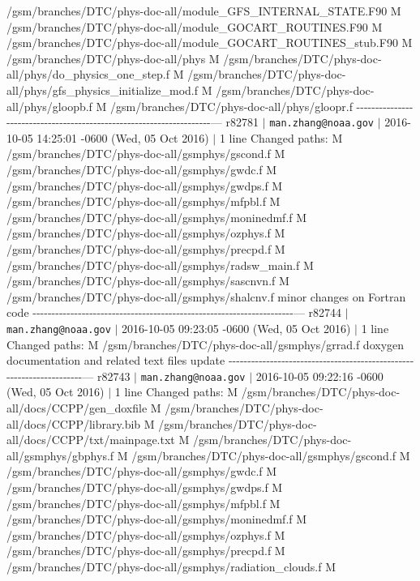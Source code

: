 \begin{DoxyItemize}
/gsm/branches/\+D\+T\+C/phys-\/doc-\/all/module\+\_\+\+G\+F\+S\+\_\+\+I\+N\+T\+E\+R\+N\+A\+L\+\_\+\+S\+T\+A\+TE.F90 M /gsm/branches/\+D\+T\+C/phys-\/doc-\/all/module\+\_\+\+G\+O\+C\+A\+R\+T\+\_\+\+R\+O\+U\+T\+I\+N\+ES.F90 M /gsm/branches/\+D\+T\+C/phys-\/doc-\/all/module\+\_\+\+G\+O\+C\+A\+R\+T\+\_\+\+R\+O\+U\+T\+I\+N\+E\+S\+\_\+stub.F90 M /gsm/branches/\+D\+T\+C/phys-\/doc-\/all/phys M /gsm/branches/\+D\+T\+C/phys-\/doc-\/all/phys/do\+\_\+physics\+\_\+one\+\_\+step.f M /gsm/branches/\+D\+T\+C/phys-\/doc-\/all/phys/gfs\+\_\+physics\+\_\+initialize\+\_\+mod.f M /gsm/branches/\+D\+T\+C/phys-\/doc-\/all/phys/gloopb.f M /gsm/branches/\+D\+T\+C/phys-\/doc-\/all/phys/gloopr.f -\/-\/-\/-\/-\/-\/-\/-\/-\/-\/-\/-\/-\/-\/-\/-\/-\/-\/-\/-\/-\/-\/-\/-\/-\/-\/-\/-\/-\/-\/-\/-\/-\/-\/-\/-\/-\/-\/-\/-\/-\/-\/-\/-\/-\/-\/-\/-\/-\/-\/-\/-\/-\/-\/-\/-\/-\/-\/-\/-\/-\/-\/-\/-\/-\/-\/-\/-\/-\/--- r82781 $\vert$ {\tt man.\+zhang@noaa.\+gov} $\vert$ 2016-\/10-\/05 14\+:25\+:01 -\/0600 (Wed, 05 Oct 2016) $\vert$ 1 line Changed paths\+: M /gsm/branches/\+D\+T\+C/phys-\/doc-\/all/gsmphys/gscond.f M /gsm/branches/\+D\+T\+C/phys-\/doc-\/all/gsmphys/gwdc.f M /gsm/branches/\+D\+T\+C/phys-\/doc-\/all/gsmphys/gwdps.f M /gsm/branches/\+D\+T\+C/phys-\/doc-\/all/gsmphys/mfpbl.f M /gsm/branches/\+D\+T\+C/phys-\/doc-\/all/gsmphys/moninedmf.f M /gsm/branches/\+D\+T\+C/phys-\/doc-\/all/gsmphys/ozphys.f M /gsm/branches/\+D\+T\+C/phys-\/doc-\/all/gsmphys/precpd.f M /gsm/branches/\+D\+T\+C/phys-\/doc-\/all/gsmphys/radsw\+\_\+main.f M /gsm/branches/\+D\+T\+C/phys-\/doc-\/all/gsmphys/sascnvn.f M /gsm/branches/\+D\+T\+C/phys-\/doc-\/all/gsmphys/shalcnv.f minor changes on Fortran code -\/-\/-\/-\/-\/-\/-\/-\/-\/-\/-\/-\/-\/-\/-\/-\/-\/-\/-\/-\/-\/-\/-\/-\/-\/-\/-\/-\/-\/-\/-\/-\/-\/-\/-\/-\/-\/-\/-\/-\/-\/-\/-\/-\/-\/-\/-\/-\/-\/-\/-\/-\/-\/-\/-\/-\/-\/-\/-\/-\/-\/-\/-\/-\/-\/-\/-\/-\/-\/--- r82744 $\vert$ {\tt man.\+zhang@noaa.\+gov} $\vert$ 2016-\/10-\/05 09\+:23\+:05 -\/0600 (Wed, 05 Oct 2016) $\vert$ 1 line Changed paths\+: M /gsm/branches/\+D\+T\+C/phys-\/doc-\/all/gsmphys/grrad.f doxygen documentation and related text files update -\/-\/-\/-\/-\/-\/-\/-\/-\/-\/-\/-\/-\/-\/-\/-\/-\/-\/-\/-\/-\/-\/-\/-\/-\/-\/-\/-\/-\/-\/-\/-\/-\/-\/-\/-\/-\/-\/-\/-\/-\/-\/-\/-\/-\/-\/-\/-\/-\/-\/-\/-\/-\/-\/-\/-\/-\/-\/-\/-\/-\/-\/-\/-\/-\/-\/-\/-\/-\/--- r82743 $\vert$ {\tt man.\+zhang@noaa.\+gov} $\vert$ 2016-\/10-\/05 09\+:22\+:16 -\/0600 (Wed, 05 Oct 2016) $\vert$ 1 line Changed paths\+: M /gsm/branches/\+D\+T\+C/phys-\/doc-\/all/docs/\+C\+C\+P\+P/gen\+\_\+doxfile M /gsm/branches/\+D\+T\+C/phys-\/doc-\/all/docs/\+C\+C\+P\+P/library.bib M /gsm/branches/\+D\+T\+C/phys-\/doc-\/all/docs/\+C\+C\+P\+P/txt/mainpage.txt M /gsm/branches/\+D\+T\+C/phys-\/doc-\/all/gsmphys/gbphys.f M /gsm/branches/\+D\+T\+C/phys-\/doc-\/all/gsmphys/gscond.f M /gsm/branches/\+D\+T\+C/phys-\/doc-\/all/gsmphys/gwdc.f M /gsm/branches/\+D\+T\+C/phys-\/doc-\/all/gsmphys/gwdps.f M /gsm/branches/\+D\+T\+C/phys-\/doc-\/all/gsmphys/mfpbl.f M /gsm/branches/\+D\+T\+C/phys-\/doc-\/all/gsmphys/moninedmf.f M /gsm/branches/\+D\+T\+C/phys-\/doc-\/all/gsmphys/ozphys.f M /gsm/branches/\+D\+T\+C/phys-\/doc-\/all/gsmphys/precpd.f M /gsm/branches/\+D\+T\+C/phys-\/doc-\/all/gsmphys/radiation\+\_\+clouds.f M 
\end{DoxyItemize}
